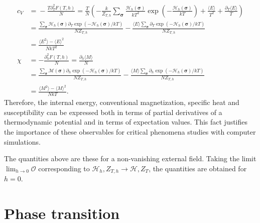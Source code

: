 \begin{align}
    c_V  \!&=\! -\frac{T\partial_T^2F(T,h)}{N} 
          = \frac{T}{N}\left( - \frac{k}{Z_{T,h}}\!\sum_{\bm{\sigma}}\frac{\mathcal{H}_h(\bm{\sigma})}{kT^2}\exp\left(-\frac{\mathcal{H}_h(\bm{\sigma})}{kT}\right) 
                              + \frac{\langle E \rangle}{T^2} + \frac{\partial_T\langle E \rangle}{T}\right) \nonumber \\
         &= \frac{\sum_{\bm{\sigma}}\mathcal{H}_h(\bm{\sigma})\partial_T\exp\left(-\mathcal{H}_h(\bm{\sigma})/kT\right)}
                 {NZ_{T,h}}
           -\frac{\langle E \rangle\sum_{\bm{\sigma}}\partial_T\exp\left(-\mathcal{H}_h(\bm{\sigma})/kT\right)}
                 {NZ_{T,h}} \nonumber \\
         &= \frac{\langle E^2 \rangle-\langle E \rangle^2}{NkT^2}  \label{align:heat} \\
    \chi &= -\frac{\partial_h^2F(T,h)}{N} = \frac{\partial_h\langle M \rangle}{N} \nonumber \\
         &= \frac{\sum_{\bm{\sigma}}\mathcal{M}(\bm{\sigma})\partial_h\exp\left(-\mathcal{H}_h(\bm{\sigma})/kT\right)}
                 {NZ_{T,h}}
           -\frac{\langle M \rangle\sum_{\bm{\sigma}}\partial_h\exp\left(-\mathcal{H}_h(\bm{\sigma})/kT\right)}
                 {NZ_{T,h}} \nonumber \\
         &= \frac{\langle M^2 \rangle-\langle M \rangle^2}{NkT}. \label{align:susc} 
\end{align}
Therefore, the internal energy, conventional magnetization, specific heat and susceptibility can be expressed both in terms of partial derivatives of a 
thermodynamic potential  and in terms of expectation values. This fact justifies the importance of these observables for critical phenomena studies with 
computer simulations.~\cite{Schwabl2000}

The quantities above are these for a non-vanishing external field. Taking the limit $\lim_{h\to0}\mathcal{O}$ corresponding to 
$\mathcal{H}_h,Z_{T,h}\to\mathcal{H},Z_T$, the quantities are obtained for $h\!=\!0$.  





\section{Phase transition}
\label{sec:phase_transitions}

